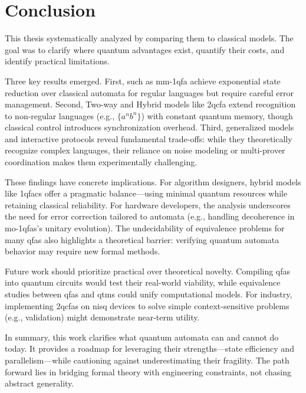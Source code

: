 \chapter{Conclusion}
\label{chap:conclusion}

This thesis systematically analyzed  by comparing them to classical models. The goal was to clarify where quantum advantages exist, quantify their costs, and identify practical limitations.

Three key results emerged. First,  such as \gls{mm-1qfa} achieve exponential state reduction over classical automata for regular languages but require careful error management. Second, Two-way and Hybrid models like \gls{2qcfa} extend recognition to non-regular languages (e.g., $\{a^n b^n\}$) with constant quantum memory, though classical control introduces synchronization overhead. Third, generalized models and interactive protocols reveal fundamental trade-offs: while they theoretically recognize complex languages, their reliance on noise modeling or multi-prover coordination makes them experimentally challenging.

These findings have concrete implications. For algorithm designers, hybrid models like \glspl{1qfac} offer a pragmatic balance—using minimal quantum resources while retaining classical reliability. For hardware developers, the analysis underscores the need for error correction tailored to automata (e.g., handling decoherence in \glspl{mo-1qfa}'s unitary evolution). The undecidability of equivalence problems for many \glspl{qfa} also highlights a theoretical barrier: verifying quantum automata behavior may require new formal methods.

Future work should prioritize practical over theoretical novelty. Compiling \glspl{qfa} into quantum circuits would test their real-world viability, while equivalence studies between \glspl{qfa} and \glspl{qtm} could unify computational models. For industry, implementing \glspl{2qcfa} on \gls{nisq} devices to solve simple context-sensitive problems (e.g.,  validation) might demonstrate near-term utility.

In summary, this work clarifies what quantum automata can and cannot do today. It provides a roadmap for leveraging their strengths—state efficiency and parallelism—while cautioning against underestimating their fragility. The path forward lies in bridging formal theory with engineering constraints, not chasing abstract generality.
